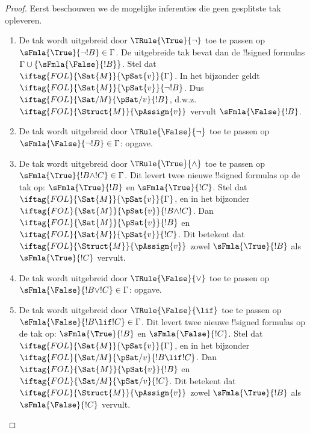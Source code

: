 \documentclass[../../../include/open-logic-section]{subfiles}
\begin{document}
\begin{proof}
Eerst beschouwen we de mogelijke inferenties die geen gesplitste tak
opleveren.
\begin{enumerate}
\item De tak wordt uitgebreid door $\TRule{\True}{\lnot}$ toe te
  passen op $\sFmla{\True}{\lnot !B} \in \Gamma$. De uitgebreide tak
  bevat dan de !!{signed formula}s $\Gamma \cup
  \{\sFmla{\False}{!B}\}$. Stel dat
  $\iftag{FOL}{\Sat{M}}{\pSat{v}}{\Gamma}$. In het bijzonder geldt
  $\iftag{FOL}{\Sat{M}}{\pSat{v}}{\lnot !B}$. Dus
  $\iftag{FOL}{\Sat/{M}}{\pSat/{v}}{!B}$, d.w.z.
  $\iftag{FOL}{\Struct{M}}{\pAssign{v}}$ vervult
  $\sFmla{\False}{!B}$.
\item De tak wordt uitgebreid door $\TRule{\False}{\lnot}$ toe te
  passen op $\sFmla{\False}{\lnot !B} \in \Gamma$: opgave.
\item De tak wordt uitgebreid door $\TRule{\True}{\land}$ toe te
  passen op $\sFmla{\True}{!B \land !C} \in \Gamma$. Dit levert twee
  nieuwe !!{signed formula}s op de tak op: $\sFmla{\True}{!B}$ en
  $\sFmla{\True}{!C}$. Stel dat
  $\iftag{FOL}{\Sat{M}}{\pSat{v}}{\Gamma}$, en in het bijzonder
  $\iftag{FOL}{\Sat{M}}{\pSat{v}}{!B \land !C}$. Dan
  $\iftag{FOL}{\Sat{M}}{\pSat{v}}{!B}$ en
  $\iftag{FOL}{\Sat{M}}{\pSat{v}}{!C}$. Dit betekent dat
  $\iftag{FOL}{\Struct{M}}{\pAssign{v}}$ zowel
  $\sFmla{\True}{!B}$ als $\sFmla{\True}{!C}$ vervult.
\item De tak wordt uitgebreid door $\TRule{\False}{\lor}$ toe te
  passen op $\sFmla{\False}{!B \lor !C} \in \Gamma$: opgave.
\item De tak wordt uitgebreid door $\TRule{\False}{\lif}$ toe te
  passen op $\sFmla{\False}{!B \lif !C} \in \Gamma$. Dit levert twee
  nieuwe !!{signed formula}s op de tak op: $\sFmla{\True}{!B}$ en
  $\sFmla{\False}{!C}$. Stel dat
  $\iftag{FOL}{\Sat{M}}{\pSat{v}}{\Gamma}$, en in het bijzonder
  $\iftag{FOL}{\Sat/{M}}{\pSat/{v}}{!B \lif !C}$. Dan
  $\iftag{FOL}{\Sat{M}}{\pSat{v}}{!B}$ en
  $\iftag{FOL}{\Sat/{M}}{\pSat/{v}}{!C}$. Dit betekent dat
  $\iftag{FOL}{\Struct{M}}{\pAssign{v}}$ zowel
  $\sFmla{\True}{!B}$ als $\sFmla{\False}{!C}$ vervult.

\end{enumerate}
\end{proof}
\end{document}
